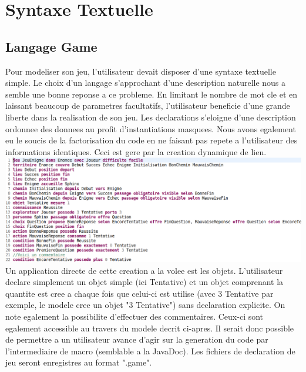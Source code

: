 \documentclass[12pt]{article}
\begin{document}
\renewcommand{\contentsname}{Sommaire}
\tableofcontents
\newpage

\section{Syntaxe Textuelle}
\subsection{Langage Game}
Pour modeliser son jeu, l'utilisateur devait disposer d'une syntaxe textuelle simple. Le choix d'un langage s'approchant d'une description naturelle nous a semble une bonne reponse a ce probleme. En limitant le nombre de mot cle et en laissant beaucoup de parametres facultatifs, l'utilisateur beneficie d'une grande liberte dans la realisation de son jeu. Les declarations s'eloigne d'une description ordonnee des donnees au profit d'instantiations masquees. Nous avons egalement eu le soucis de la factorisation du code en ne faisant pas repete a l'utilisateur des informations identiques. Ceci est gere par la creation dynamique de lien.
\newline\newline
\includegraphics[width=\textwidth]{images/enigme_game}
\newline\newline
Un application directe de cette creation a la volee est les objets. L'utilisateur declare simplement un objet simple (ici Tentative) et un objet comprenant la quantite est cree a chaque fois que celui-ci est utilise (avec 3 Tentative par exemple, le modele cree un objet "3 Tentative") sans declaration explicite.\newline
On note egalement la possibilite d'effectuer des commentaires. Ceux-ci sont egalement accessible au travers du modele decrit ci-apres. Il serait donc possible de permettre a un utilisateur avance d'agir sur la generation du code par l'intermediaire de macro (semblable a la JavaDoc).
Les fichiers de declaration de jeu seront enregistres au format ".game".
\end{document}
